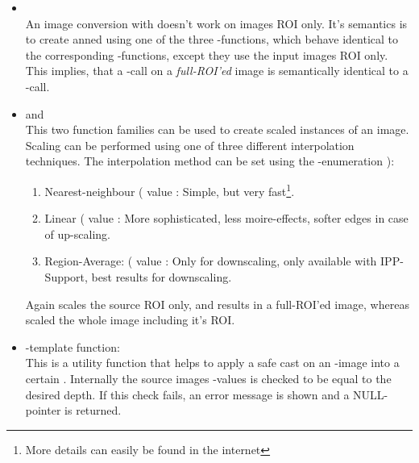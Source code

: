 \begin{itemize}
\item {}\\
An image conversion with  doesn't work on images ROI only. It's semantics is to create anned using one of the three -functions, which behave identical to the corresponding -functions, except they use the input images ROI only. This implies, that a -call on a \emph{full-ROI'ed} image is semantically identical to a -call.
\item {} and \\
This two function families can be used to create scaled instances of an image. Scaling can be performed using one of three different interpolation techniques. The interpolation method can be set using the -enumeration ):
\begin{enumerate}
  \item Nearest-neighbour ( value :  Simple, but very fast\footnote{More details can easily be found in the internet}.
  \item Linear ( value : More sophisticated, less moire-effects, softer edges in case of up-scaling.
  \item Region-Average: ( value : Only for downscaling, only available with IPP-Support, best results for downscaling.  
\end{enumerate}
Again  scales the source ROI only, and results in a full-ROI'ed image, whereas  scaled the whole image including it's ROI.
\item {}-template function:\\
This is a utility function that helps to apply a safe cast on an -image into a certain . Internally the source images -values is checked to be equal to the desired depth. If this check fails, an error message is shown and a NULL-pointer is returned.

\end{itemize}


